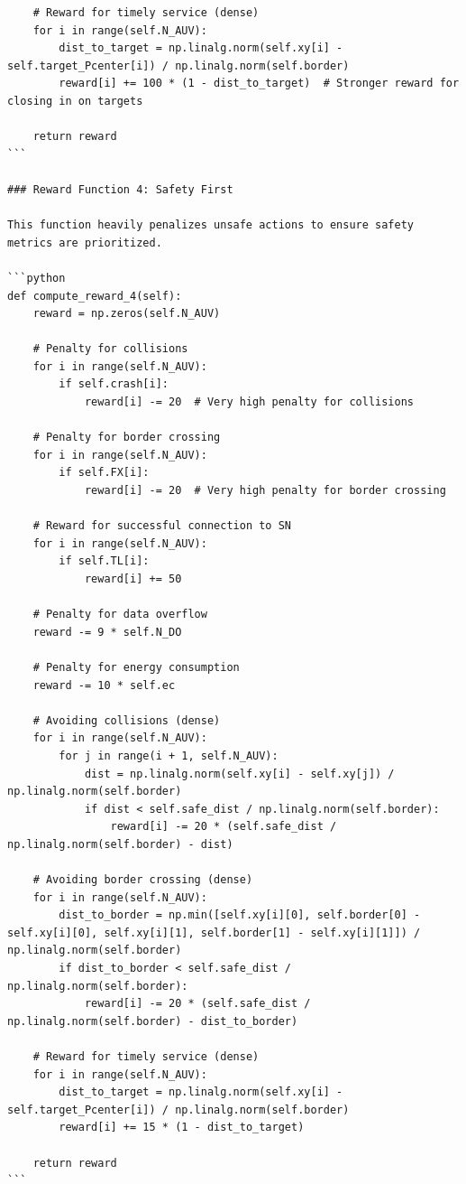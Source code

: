 \documentclass{article}
\begin{document}
\begin{verbatim}
    # Reward for timely service (dense)
    for i in range(self.N_AUV):
        dist_to_target = np.linalg.norm(self.xy[i] - self.target_Pcenter[i]) / np.linalg.norm(self.border)
        reward[i] += 100 * (1 - dist_to_target)  # Stronger reward for closing in on targets

    return reward
```

### Reward Function 4: Safety First

This function heavily penalizes unsafe actions to ensure safety metrics are prioritized.

```python
def compute_reward_4(self):
    reward = np.zeros(self.N_AUV)
    
    # Penalty for collisions
    for i in range(self.N_AUV):
        if self.crash[i]:
            reward[i] -= 20  # Very high penalty for collisions

    # Penalty for border crossing
    for i in range(self.N_AUV):
        if self.FX[i]:
            reward[i] -= 20  # Very high penalty for border crossing

    # Reward for successful connection to SN
    for i in range(self.N_AUV):
        if self.TL[i]:
            reward[i] += 50

    # Penalty for data overflow
    reward -= 9 * self.N_DO

    # Penalty for energy consumption
    reward -= 10 * self.ec

    # Avoiding collisions (dense)
    for i in range(self.N_AUV):
        for j in range(i + 1, self.N_AUV):
            dist = np.linalg.norm(self.xy[i] - self.xy[j]) / np.linalg.norm(self.border)
            if dist < self.safe_dist / np.linalg.norm(self.border):
                reward[i] -= 20 * (self.safe_dist / np.linalg.norm(self.border) - dist)

    # Avoiding border crossing (dense)
    for i in range(self.N_AUV):
        dist_to_border = np.min([self.xy[i][0], self.border[0] - self.xy[i][0], self.xy[i][1], self.border[1] - self.xy[i][1]]) / np.linalg.norm(self.border)
        if dist_to_border < self.safe_dist / np.linalg.norm(self.border):
            reward[i] -= 20 * (self.safe_dist / np.linalg.norm(self.border) - dist_to_border)

    # Reward for timely service (dense)
    for i in range(self.N_AUV):
        dist_to_target = np.linalg.norm(self.xy[i] - self.target_Pcenter[i]) / np.linalg.norm(self.border)
        reward[i] += 15 * (1 - dist_to_target)

    return reward
```


\end{verbatim}
\end{document}
